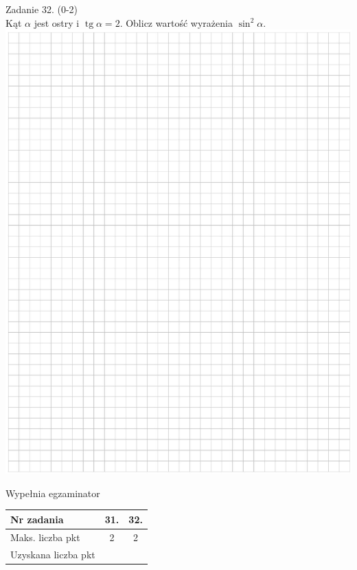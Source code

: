 \documentclass[10pt]{article}
\begin{document}
Zadanie 32. (0-2)\\
Kąt \(\alpha\) jest ostry i \(\operatorname{tg} \alpha=2\). Oblicz wartość wyrażenia \(\sin ^{2} \alpha\).\\
\includegraphics[max width=\textwidth, center]{2024_11_21_465acd0c12fa3e05e8a7g-19}

Wypełnia egzaminator

\begin{center}
\begin{tabular}{|l|c|c|}
\hline
Nr zadania & 31. & 32. \\
\hline
Maks. liczba pkt & 2 & 2 \\
\hline
Uzyskana liczba pkt &  &  \\
\hline
\end{tabular}
\end{center}
\end{document}
